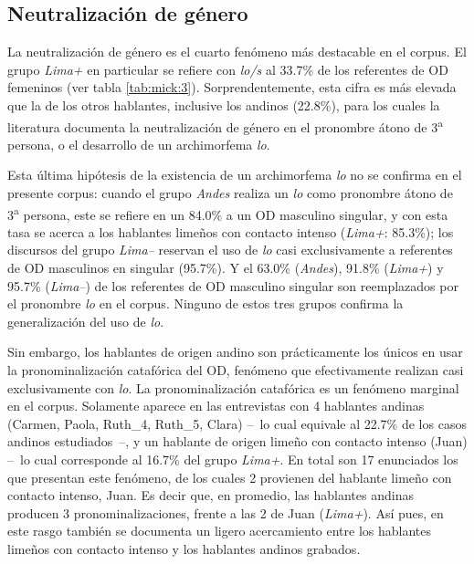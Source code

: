 \documentclass[output=paper]{../langscibook}
\begin{document}
\subsection{Neutralización de género}
\largerpage
La neutralización de género es el cuarto fenómeno más destacable en el corpus. El grupo \textit{Lima+} en particular se refiere con \textit{lo/s} al 33.7\% de los referentes de OD femeninos (ver tabla \ref{tab:mick:3}). Sorprendentemente, esta cifra es más elevada que la de los otros hablantes, inclusive los andinos (22.8\%), para los cuales la literatura documenta la neutralización de género en el pronombre átono de 3\textsuperscript{a} persona, o el desarrollo de un archimorfema \textit{lo}.

Esta última hipótesis de la existencia de un archimorfema \textit{lo} no se confirma en el presente corpus: cuando el grupo \textit{Andes} realiza un \textit{lo} como pronombre átono de 3\textsuperscript{a} persona, este se refiere en un 84.0\% a un OD masculino singular, y con esta tasa se acerca a los hablantes limeños con contacto intenso (\textit{Lima+}: 85.3\%); los discursos del grupo \textit{Lima–} reservan el uso de \textit{lo} casi exclusivamente a referentes de OD masculinos en singular (95.7\%). Y el 63.0\% (\textit{Andes}), 91.8\% (\textit{Lima+}) y 95.7\% (\textit{Lima–}) de los referentes de OD masculino singular son reemplazados por el pronombre \textit{lo} en el corpus. Ninguno de estos tres grupos confirma la generalización del uso de \textit{lo}.

Sin embargo, los hablantes de origen andino son prácticamente los únicos en usar la pronominalización catafórica del OD, fenómeno que efectivamente realizan casi exclusivamente con \textit{lo}. La pronominalización catafórica es un fenómeno marginal en el corpus. Solamente aparece en las entrevistas con 4 hablantes andinas (Carmen, Paola, Ruth\_4, Ruth\_5, Clara) – lo cual equivale al 22.7\% de los casos andinos estudiados –, y un hablante de origen limeño con contacto intenso (Juan) – lo cual corresponde al 16.7\% del grupo \textit{Lima+}. En total son 17 enunciados los que presentan este fenómeno, de los cuales 2 provienen del hablante limeño con contacto intenso, Juan. Es decir que, en promedio, las hablantes andinas producen 3 pronominalizaciones, frente a las 2 de Juan (\textit{Lima+}). Así pues, en este rasgo también se documenta un ligero acercamiento entre los hablantes limeños con contacto intenso y los hablantes andinos grabados.
\end{document}
